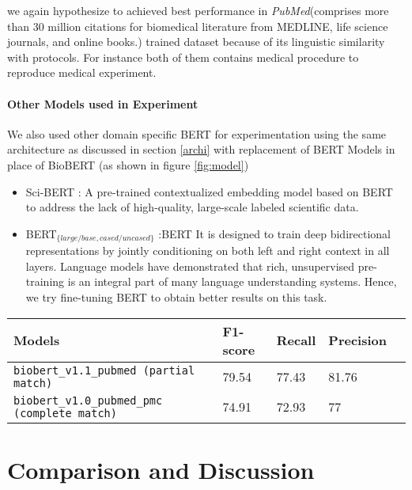 \documentclass[11pt,a4paper]{article}
\begin{document}
we again hypothesize to achieved best performance in \textit{PubMed}(comprises more than 30 million citations for biomedical literature from MEDLINE, life science journals, and online books.) trained dataset because of its linguistic similarity with protocols. For instance both of them contains medical procedure to reproduce medical experiment.

\paragraph{Other Models used in Experiment}We also used other domain specific BERT for experimentation using the same architecture as discussed in section \ref{archi} with replacement of BERT Models in place of BioBERT (as shown in figure \ref{fig:model})
\begin{itemize}
\item Sci-BERT \cite{Beltagy2019SciBERT} : A pre-trained contextualized embedding model based on BERT to address the lack of high-quality, large-scale labeled scientific data.
\item BERT$_{\{large/base, cased/uncased\}}$ :BERT \cite{devlin2018pretraining} It is designed to train deep bidirectional representations by jointly conditioning on both left and right context in all layers. Language models have demonstrated that rich, unsupervised pre-training is an integral part of many language understanding systems. Hence, we try fine-tuning BERT to obtain better results on this task.
\end{itemize}




\begin{table*}
\centering
\begin{tabular}{lllll}
\hline
\textbf{Models} & \textbf{F1-score} & \textbf{Recall} & \textbf{Precision}\\
\hline
\verb|biobert_v1.1_pubmed (partial match)| & 79.54 &  77.43 & 81.76 \\ 
\verb|biobert_v1.0_pubmed_pmc (complete match)|  & 74.91 &  72.93 & 77  \\\hline
\end{tabular}

\caption{\label{result-2} 
{Results on the held-out test set provided by shared task organisers on final submission}
}

\end{table*}


\section{Comparison and Discussion} \label{exp}
\end{document}

